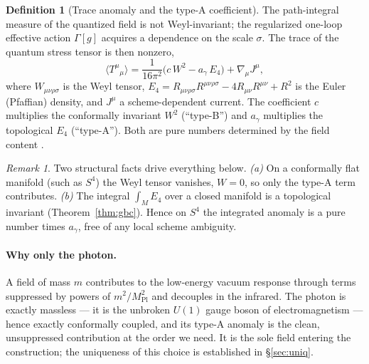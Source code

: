 \documentclass[11pt,a4paper]{article}
\theoremstyle{definition}
\newtheorem{definition}{Definition}
\theoremstyle{remark}
\newtheorem{remark}{Remark}
\newcommand{\ag}{a_\gamma}
\newcommand{\Mpl}{M_{\mathrm{Pl}}}
\newcommand{\avg}[1]{\langle #1\rangle}
\begin{document}
\begin{definition}[Trace anomaly and the type-A coefficient]
The path-integral measure of the quantized field is not Weyl-invariant; the regularized one-loop
effective action $\Gamma[g]$ acquires a dependence on the scale $\sigma$. The trace of the
quantum stress tensor is then nonzero,
\begin{equation}\label{eq:anomaly}
\avg{T^\mu{}_\mu}=\frac{1}{16\pi^2}\bigl(c\,W^2-\ag\,E_4\bigr)+\nabla_\mu J^\mu,
\end{equation}
where $W_{\mu\nu\rho\sigma}$ is the Weyl tensor,
$E_4=R_{\mu\nu\rho\sigma}R^{\mu\nu\rho\sigma}-4R_{\mu\nu}R^{\mu\nu}+R^2$ is the Euler (Pfaffian)
density, and $J^\mu$ a scheme-dependent current. The coefficient $c$ multiplies the conformally
invariant $W^2$ (``type-B'') and $\ag$ multiplies the topological $E_4$ (``type-A''). Both are
pure numbers determined by the field content \cite{DeserSchwimmer,Duff1994}.
\end{definition}

\begin{remark}\label{rem:why}
Two structural facts drive everything below. \emph{(a)} On a conformally flat manifold (such as
$S^4$) the Weyl tensor vanishes, $W=0$, so only the type-A term contributes. \emph{(b)} The
integral $\int_M E_4$ over a closed manifold is a topological invariant (Theorem~\ref{thm:gbc}).
Hence on $S^4$ the integrated anomaly is a pure number times $\ag$, free of any local scheme
ambiguity.
\end{remark}

\paragraph{Why only the photon.} A field of mass $m$ contributes to the low-energy vacuum response
through terms suppressed by powers of $m^2/\Mpl^2$ and decouples in the infrared. The photon is
exactly massless --- it is the unbroken $U(1)$ gauge boson of electromagnetism --- hence exactly
conformally coupled, and its type-A anomaly is the clean, unsuppressed contribution at the order we
need. It is the sole field entering the construction; the uniqueness of this choice is established
in \S\ref{sec:uniq}.
\end{document}
